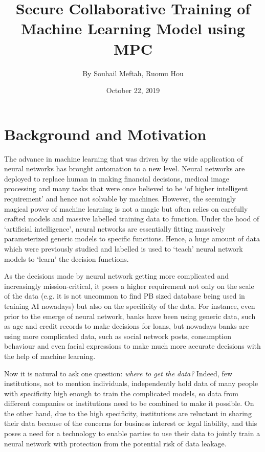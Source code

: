 \documentclass[a4paper,12pt]{article}
\begin{document}
\title{\Large{\textbf{Secure Collaborative Training of Machine Learning Model using MPC}}}
\author{By Souhail Meftah, Ruomu Hou}
\date{October 22, 2019}
\maketitle
\let\cleardoublepage\clearpage
\setcounter{page}{1}
\fancyhf{}



\section{Background and Motivation}
The advance in machine learning that was driven by the wide application of neural networks has brought automation to a new level. Neural networks are deployed to replace human in making financial decisions, medical image processing and many tasks that were once believed to be `of higher intelligent requirement' and hence not solvable by machines. However, the seemingly magical power of machine learning is not a magic but often relies on carefully crafted models and massive labelled training data to function. Under the hood of `artificial intelligence', neural networks are essentially fitting massively parameterized generic models to specific functions. Hence, a huge amount of data which were previously studied and labelled is used to `teach' neural network models to `learn' the decision functions.

As the decisions made by neural network getting more complicated and increasingly mission-critical, it poses a higher requirement not only on the scale of the data (e.g. it is not uncommon to find PB sized database being used in training AI nowadays) but also on the specificity of the data. For instance, even prior to the emerge of neural network, banks have been using generic data, such as age and credit records to make decisions for loans, but nowadays banks are using more complicated data, such as social network posts, consumption behaviour and even facial expressions to make much more accurate decisions with the help of machine learning. 

Now it is natural to ask one question: \textit{where to get the data?} Indeed, few institutions, not to mention individuals, independently hold data of many people with specificity high enough to train the complicated models, so data from different companies or institutions need to be combined to make it possible. On the other hand, due to the high specificity, institutions are reluctant in sharing their data because of the concerns for business interest or legal liability, and this poses a need for a technology to enable parties to use their data to jointly train a neural network with protection from the potential risk of data leakage.
\end{document}
